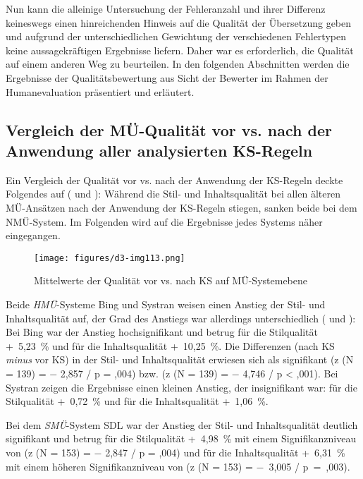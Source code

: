 Nun kann die alleinige Untersuchung der Fehleranzahl und ihrer Differenz keineswegs einen hinreichenden Hinweis auf die Qualität der Übersetzung geben und aufgrund der unterschiedlichen Gewichtung der verschiedenen Fehlertypen keine aussagekräftigen Ergebnisse liefern. Daher war es erforderlich, die Qualität auf einem anderen Weg zu beurteilen. In den folgenden Abschnitten werden die Ergebnisse der Qualitätsbewertung aus Sicht der Bewerter im Rahmen der Humanevaluation präsentiert und erläutert.

\subsection{Vergleich der MÜ-Qualität vor vs. nach der Anwendung aller analysierten KS-Regeln}
\label{sec:5.4.5}

Ein Vergleich der Qualität vor vs. nach der Anwendung der KS-Regeln deckte Folgendes auf ( und ): Während die Stil- und Inhaltsqualität bei allen älteren MÜ-Ansätzen nach der Anwendung der KS-Regeln stiegen, sanken beide bei dem NMÜ-System. Im Folgenden wird auf die Ergebnisse jedes Systems näher eingegangen.


\begin{figure}

\texttt{[image: figures/d3-img113.png]}

\caption{\label{fig:05:141}Mittelwerte der Qualität vor vs. nach KS auf MÜ-Systemebene   }
\end{figure}

Beide \textit{HMÜ}{}-Systeme Bing und Systran weisen einen Anstieg der Stil- und Inhaltsqualität auf, der Grad des Anstiegs war allerdings unterschiedlich (
 und ): Bei Bing war der Anstieg hochsignifikant und betrug für die Stilqualität +~5,23~\% und für die Inhaltsqualität +~10,25~\%. Die Differenzen (nach KS \textit{minus} vor KS) in der Stil- und Inhaltsqualität erwiesen sich als signifikant (z (N = 139) = $-$ 2,857 / p = ,004) bzw. (z (N = 139) = $-$ 4,746 / p < ,001). Bei Systran zeigen die Ergebnisse einen kleinen Anstieg, der insignifikant war: für die Stilqualität +~0,72~\% und für die Inhaltsqualität +~1,06~\%.

Bei dem \textit{SMÜ}{}-System SDL war der Anstieg der Stil- und Inhaltsqualität deutlich signifikant und betrug für die Stilqualität +~4,98~\% mit einem Signifikanzniveau von (z (N = 153) = $-$ 2,847 / p = ,004) und für die Inhaltsqualität +~6,31~\% mit einem höheren Signifikanzniveau von (z (N = 153) = $-$~3,005 / p~=~,003).


